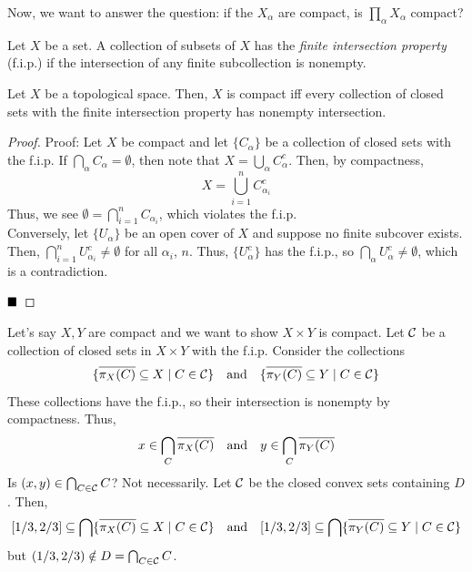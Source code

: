 Now, we want to answer the question: if the $X_{\alpha}$ are compact, is $\prod_{\alpha} X_{\alpha}$ compact?

\begin{definition}
    Let $X$ be a set. A collection of subsets of $X$ has the \emph{finite intersection property} (f.i.p.) if the intersection of any finite subcollection is nonempty.
\end{definition}

\begin{lemma}
    Let $X$ be a topological space. Then, $X$ is compact iff every collection of closed sets with the finite intersection property has nonempty intersection.
\end{lemma}
\begin{proof}{Proof:}
    Let $X$ be compact and let $\{C_{\alpha}\}$ be a collection of closed sets with the f.i.p. If $\bigcap_{\alpha} C_{\alpha} = \emptyset$, then note that $X = \bigcup_{\alpha} C_{\alpha}^{c}$. Then, by compactness,
    \[ X = \bigcup_{i = 1}^{n} C_{\alpha_i}^{c} \]
    Thus, we see $\emptyset = \bigcap_{i = 1}^{n} C_{\alpha_i}$, which violates the f.i.p.\\

    Conversely, let $\{U_{\alpha}\}$ be an open cover of $X$ and suppose no finite subcover exists. Then, $\bigcap_{i = 1}^{n} U_{\alpha_i}^{c} \neq \emptyset$ for all $\alpha_i$, $n$. Thus, $\{U_{\alpha}^{c}\}$ has the f.i.p., so $\bigcap_{\alpha} U_{\alpha}^{c} \neq \emptyset$, which is a contradiction.

    $\qed$
\end{proof}

Let's say $X, Y$ are compact and we want to show $X \times Y$ is compact. Let $\cal{C}$ be a collection of closed sets in $X \times Y$ with the f.i.p. Consider the collections
\[ \{\overline{\pi_X(C)} \subseteq X \mid C \in \cal{C}\} \quand \{\overline{\pi_Y(C)} \subseteq Y \mid C \in \cal{C}\} \]
These collections have the f.i.p., so their intersection is nonempty by compactness. Thus,
\[ x \in \bigcap_{C} \overline{\pi_X(C)} \quand y \in \bigcap_{C} \overline{\pi_Y(C)} \]
Is $(x, y) \in \bigcap_{C \in \cal{C}} C$? Not necessarily.
Let $\cal{C}$ be the closed convex sets containing $D$. Then,
\[ [1/3, 2/3] \subseteq \bigcap\{\overline{\pi_X(C)} \subseteq X \mid C \in \cal{C}\} \quand [1/3, 2/3] \subseteq \bigcap\{\overline{\pi_Y(C)} \subseteq Y \mid C \in \cal{C}\} \]
but $(1/3, 2/3) \notin D = \bigcap_{C \in \cal{C}} C$.\\

